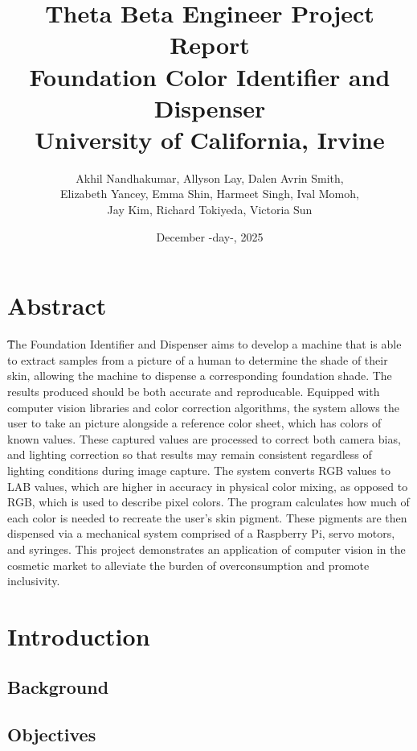 \documentclass[12pt, letterpaper]{report}
\title{
    \textbf{Theta Beta Engineer Project Report}\\[0.5em]
    \large Foundation Color Identifier and Dispenser\\
    University of California, Irvine
}
\author{
    Akhil Nandhakumar, Allyson Lay, Dalen Avrin Smith,\\
    Elizabeth Yancey, Emma Shin, Harmeet Singh, Ival Momoh,\\
    Jay Kim, Richard Tokiyeda, Victoria Sun
}
\date{December -day-, 2025}
\begin{document}
    \maketitle

    \linenumbers

    \tableofcontents
    \listoffigures
    \listoftables
    \newpage


    \chapter{Abstract}
    \t{}The Foundation Identifier and Dispenser aims to develop a machine that is able to
    extract samples from a picture of a human to determine the shade of their skin, allowing
    the machine to dispense a corresponding foundation shade. The results produced
    should be both accurate and reproducable. Equipped with computer vision libraries
    and color correction algorithms, the system allows the user to take an picture alongside 
    a reference color sheet, which has colors of known values. These captured values are 
    processed to correct both camera bias, and lighting correction so that results
    may remain consistent regardless of lighting conditions during image capture. The system
    converts RGB values to LAB values, which are higher in accuracy in physical color 
    mixing, as opposed to RGB, which is used to describe pixel colors. The program calculates
    how much of each color is needed to recreate the user's skin pigment. These pigments are
    then dispensed via a mechanical system comprised of a Raspberry Pi, servo motors, and 
    syringes. This project demonstrates an application of computer vision in the cosmetic
    market to alleviate the burden of overconsumption and promote inclusivity. 


    \chapter{Introduction}

    \section{Background}

    \section{Objectives}
\end{document}
